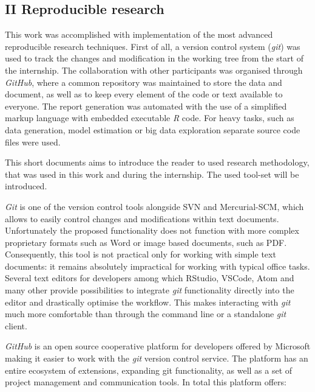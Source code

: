 \documentclass[12pt,]{article}
\begin{document}
\newpage

\hypertarget{ii-reproducible-research}{%
\subsection*{II Reproducible research}\label{ii-reproducible-research}}

This work was accomplished with implementation of the most advanced
reproducible research techniques. First of all, a version control system
(\emph{git}) was used to track the changes and modification in the
working tree from the start of the internship. The collaboration with
other participants was organised through \emph{GitHub}, where a common
repository was maintained to store the data and document, as well as to
keep every element of the code or text available to everyone. The report
generation was automated with the use of a simplified markup language
with embedded executable \emph{R} code. For heavy tasks, such as data
generation, model estimation or big data exploration separate source
code files were used.

This short documents aims to introduce the reader to used research
methodology, that was used in this work and during the internship. The
used tool-set will be introduced.

\emph{Git} is one of the version control tools alongside SVN and
Mercurial-SCM, which allows to easily control changes and modifications
within text documents. Unfortunately the proposed functionality does not
function with more complex proprietary formats such as Word or image
based documents, such as PDF. Consequently, this tool is not practical
only for working with simple text documents: it remains absolutely
impractical for working with typical office tasks. Several text editors
for developers among which RStudio, VSCode, Atom and many other provide
possibilities to integrate \emph{git} functionality directly into the
editor and drastically optimise the workflow. This makes interacting
with \emph{git} much more comfortable than through the command line or a
standalone \emph{git} client.

\emph{GitHub} is an open source cooperative platform for developers
offered by Microsoft making it easier to work with the \emph{git}
version control service. The platform has an entire ecosystem of
extensions, expanding git functionality, as well as a set of project
management and communication tools. In total this platform offers:
\end{document}
